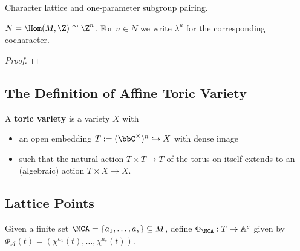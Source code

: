 \begin{definition}
  \label{1-1-char-cochar-pairing}

  Character lattice and one-parameter subgroup pairing.
\end{definition}


\begin{proposition}
  \label{1-1-cochar-torus}

  $N = \Hom(M, \Z) \cong \Z^n$. For $u \in N$ we write $\lambda^u$ for the corresponding cocharacter.
\end{proposition}
\begin{proof}

\end{proof}


\subsection{The Definition of Affine Toric Variety}


\begin{definition}
  \label{1-1-3-aff-tor-var}
  \leanok

  A {\bf toric variety} is a variety $X$ with
  \begin{itemize}
    \item an open embedding $T := (\bbC^\times)^n \hookrightarrow X$ with dense image
    \item such that the natural action $T \times T \to T$ of the torus on itself extends to an (algebraic) action $T \times X \to X$.
  \end{itemize}
\end{definition}


\subsection{Lattice Points}


\begin{definition}
  \label{1-1-phiA}

  Given a finite set $\MCA = \{a_1, \dotsc, a_s\} \subseteq M$, define $\Phi_\MCA : T \to \mathbb{A}^s$ given by $\Phi_{\mathcal A} (t) = (\chi^{a_1} (t), \dotsc, \chi^{a_s} (t))$.
\end{definition}


